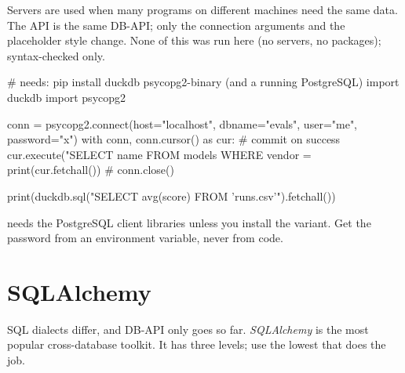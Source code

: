 Servers are used when many programs on different machines need the same data. The API is
the same DB-API; only the connection arguments and the placeholder style change. None of
this was run here (no servers, no packages); syntax-checked only.

\begin{pycode}
# needs: pip install duckdb psycopg2-binary  (and a running PostgreSQL)
import duckdb
import psycopg2

conn = psycopg2.connect(host="localhost", dbname="evals", user="me",
                        password="x")
with conn, conn.cursor() as cur:               # commit on success
    cur.execute("SELECT name FROM models WHERE vendor = %
    print(cur.fetchall())                      # %
conn.close()

print(duckdb.sql("SELECT avg(score) FROM 'runs.csv'").fetchall())
\end{pycode}

 needs the PostgreSQL client libraries unless you install the
 variant. Get the password from an environment variable, never from code.

\section{SQLAlchemy}

SQL dialects differ, and DB-API only goes so far. \emph{SQLAlchemy} is the most popular
cross-database toolkit. It has three levels; use the lowest that does the job.

\begin{center}
\end{center}

